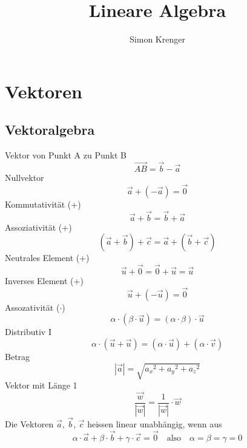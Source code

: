 \documentclass{report}
\title{Lineare Algebra}
\author{Simon Krenger}
\begin{document}
\maketitle
\chapter{Vektoren}
\section{Vektoralgebra}
Vektor von Punkt A zu Punkt B\begin{equation}\vec{AB} = \vec{b} - \vec{a}\end{equation}
Nullvektor\begin{equation}\vec{a} + (- \vec{a}) = \vec{0}\end{equation}
Kommutativität (+)\begin{equation}\vec{a} + \vec{b} = \vec{b} + \vec{a}\end{equation}
Assoziativität (+)\begin{equation}(\vec{a} + \vec{b}) + \vec{c} = \vec{a} + (\vec{b} + \vec{c})\end{equation}
Neutrales Element (+)\begin{equation}\vec{u} + \vec{0} = \vec{0} + \vec{u} = \vec{u}\end{equation}
Inverses Element (+)\begin{equation}\vec{u} + (- \vec{u}) = \vec{0}\end{equation}
Assozativität ($\cdot$)\begin{equation}\alpha \cdot (\beta \cdot \vec{u}) = (\alpha \cdot \beta) \cdot \vec{u}\end{equation}
Distributiv I\begin{equation}\alpha \cdot (\vec{u} + \vec{u})  = (\alpha \cdot \vec{u})+(\alpha \cdot \vec{v})\end{equation}
Betrag\begin{equation}|\vec{a}| = \sqrt{{a_x}^2+{a_y}^2+{a_z}^2}\end{equation}
Vektor mit Länge 1\begin{equation}\frac{\vec{w}}{|\vec{w}|} = \frac{1}{|\vec{w}|} \cdot \vec{w}\end{equation}
Die Vektoren $\vec{a}$, $\vec{b}$, $\vec{c}$ heissen linear unabhängig, wenn aus 
\begin{equation}\alpha \cdot \vec{a} + \beta \cdot \vec{b} + \gamma \cdot \vec{c} = \vec{0} \quad \mbox{also} \quad \alpha = \beta = \gamma = 0\end{equation}
\end{document}
